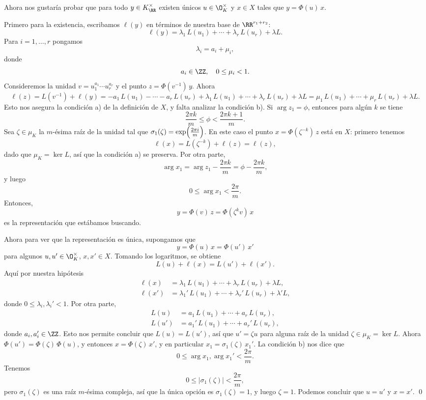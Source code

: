 Ahora nos gustaría probar que para todo $y \in K_\RR^\times$ existen únicos
$u \in \O_K^\times$ y $x \in X$ tales que $y = \Phi (u)\,x$.

Primero para la existencia, escribamos $\ell (y)$ en términos de nuestra base
de $\RR^{r_1+r_2}$:
$$\ell (y) = \lambda_1 \, L (u_1) + \cdots + \lambda_r \, L (u_r) + \lambda L.$$
Para $i = 1,\ldots,r$ pongamos
$$\lambda_i = a_i + \mu_i,$$
donde
$$a_i \in \ZZ, \quad 0 \le \mu_i < 1.$$
Consideremos la unidad $v = u_1^{a_1}\cdots u_r^{a_r}$ y el punto
$z = \Phi (v^{-1})\,y$. Ahora
\[ \ell (z) = L (v^{-1}) + \ell (y) =
   - a_1\,L (u_1) - \cdots - a_r\,L(u_r)
   + \lambda_1 \, L (u_1) + \cdots + \lambda_r \, L (u_r) + \lambda L =
   \mu_1 \, L (u_1) + \cdots + \mu_r \, L (u_r) + \lambda L. \]
Esto nos asegura la condición a) de la definición de $X$, y falta analizar
la condición b). Si $\arg z_1 = \phi$, entonces para algún $k$ se tiene
$$\frac{2\pi k}{m} \le \phi < \frac{2\pi {k+1}}{m}.$$
Sea $\zeta \in \mu_K$ la $m$-ésima raíz de la unidad tal que
$\sigma_1 (\zeta) = \exp \Bigl(\frac{2\pi i}{m}\Bigr)$. En este caso el punto
$x = \Phi (\zeta^{-k})\,z$ está en $X$: primero tenemos
$$\ell (x) = L (\zeta^{-k}) + \ell (z) = \ell (z),$$
dado que $\mu_K = \ker L$, así que la condición a) se preserva. Por otra parte,
$$\arg x_1 = \arg z_1 - \frac{2\pi k}{m} = \phi - \frac{2\pi k}{m},$$
y luego
$$0 \le \arg x_1 < \frac{2\pi}{m}.$$
Entonces,
$$y = \Phi (v)\,z = \Phi (\zeta^k v)\,x$$
es la representación que estábamos buscando.

Ahora para ver que la representación es única, supongamos que
$$y = \Phi (u)\,x = \Phi (u')\,x'$$
para algunos $u,u' \in \O_K^\times$, $x,x' \in X$. Tomando los logaritmos, se
obtiene
$$L (u) + \ell (x) = L (u') + \ell (x').$$
Aquí por nuestra hipótesis
\begin{align*}
  \ell (x) & = \lambda_1 \, L (u_1) + \cdots + \lambda_r \, L (u_r) + \lambda L, \\
  \ell (x') & = \lambda_1' \, L (u_1) + \cdots + \lambda_r' \, L (u_r) + \lambda' L,
\end{align*}
donde $0 \le \lambda_i, \lambda_i' < 1$. Por otra parte,
\begin{align*}
  L (u) & = a_1 \, L (u_1) + \cdots + a_r \, L (u_r), \\
  L (u') & = a_1' \, L (u_1) + \cdots + a_r' \, L (u_r),
\end{align*}
donde $a_i,a_i' \in \ZZ$. Esto nos permite concluir que $L (u) = L (u')$, así
que $u' = \zeta u$ para alguna raíz de la unidad $\zeta \in \mu_K = \ker L$.
Ahora $\Phi (u') = \Phi (\zeta)\,\Phi (u)$, y entonces
$x = \Phi (\zeta)\,x'$, y en particular $x_1 = \sigma_1 (\zeta)\,x_1'$.
La condición b) nos dice que
$$0 \le \arg x_1, \arg x_1' < \frac{2\pi}{m}.$$
Tenemos
$$0 \le |\sigma_1 (\zeta)| < \frac{2\pi}{m},$$
pero $\sigma_1 (\zeta)$ es una raíz $m$-ésima compleja, así que la única opción
es $\sigma_1 (\zeta) = 1$, y luego $\zeta = 1$. Podemos concluir que $u = u'$ y
$x = x'$. \qed

